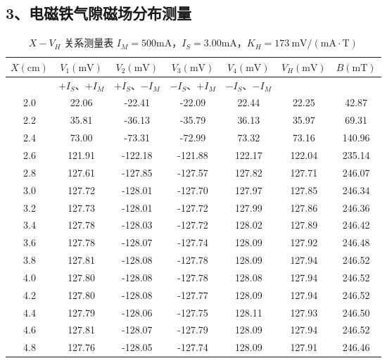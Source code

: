 \documentclass[UTF8]{article}
\begin{document}
    \subsection*{3、电磁铁气隙磁场分布测量}
    \begin{table}[H]
    	\centering
    	\caption{$X-V_H$ 关系测量表 \quad $I_M=500\mathrm{mA}$，$I_S=3.00\mathrm{mA}$，$K_H=173\ \mathrm{mV/(mA\cdot T)}$}
    	\label{tab:x_vh}
    	\begin{tabular}{|c|c|c|c|c|c|c|}
    		\hline
    		$X(\mathrm{cm})$ & $V_1(\mathrm{mV})$ & $V_2(\mathrm{mV})$ & $V_3(\mathrm{mV})$ & $V_4(\mathrm{mV})$ & $V_H(\mathrm{mV})$ & $B(\mathrm{mT})$ \\
    		\hline
    		& $+I_S$、$+I_M$ & $+I_S$、$-I_M$ & $-I_S$、$+I_M$ & $-I_S$、$-I_M$ & & \\
    		\hline
    		2.0 & 22.06 & -22.41 & -22.09 & 22.44 & 22.25 & 42.87 \\
    		\hline
    		2.2 & 35.81 & -36.13 & -35.79 & 36.13 & 35.97 & 69.31 \\
    		\hline
    		2.4 & 73.00 & -73.31 & -72.99 & 73.32 & 73.16 & 140.96 \\
    		\hline
    		2.6 & 121.91 & -122.18 & -121.88 & 122.17 & 122.04 & 235.14 \\
    		\hline
    		2.8 & 127.61 & -127.85 & -127.57 & 127.82 & 127.71 & 246.07 \\
    		\hline
    		3.0 & 127.72 & -128.01 & -127.70 & 127.97 & 127.85 & 246.34 \\
    		\hline
    		3.2 & 127.73 & -128.01 & -127.72 & 127.99 & 127.86 & 246.36 \\
    		\hline
    		3.4 & 127.78 & -128.03 & -127.72 & 128.02 & 127.89 & 246.42 \\
    		\hline
    		3.6 & 127.78 & -128.07 & -127.74 & 128.09 & 127.92 & 246.48 \\
    		\hline
    		3.8 & 127.81 & -128.08 & -127.78 & 128.09 & 127.94 & 246.52 \\
    		\hline
    		4.0 & 127.80 & -128.08 & -127.78 & 128.08 & 127.94 & 246.52 \\
    		\hline
    		4.2 & 127.80 & -128.08 & -127.77 & 128.09 & 127.94 & 246.52 \\
    		\hline
    		4.4 & 127.79 & -128.06 & -127.75 & 128.11 & 127.93 & 246.50 \\
    		\hline
    		4.6 & 127.81 & -128.07 & -127.79 & 128.09 & 127.94 & 246.52 \\
    		\hline
    		4.8 & 127.76 & -128.05 & -127.74 & 128.09 & 127.91 & 246.46 \\

\end{tabular}
\end{table}
\end{document}
